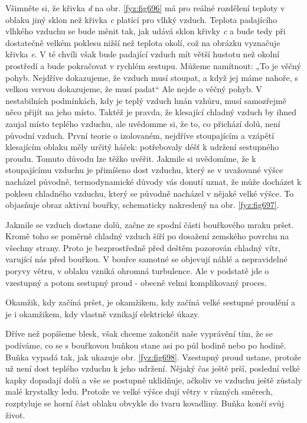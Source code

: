     Všimněte si, že křivka \emph{d} na obr. \ref{fyz:fig696} má pro reálné rozdělení teploty v
    oblaku jiný sklon než křivka \emph{c} platící pro vlhký vzduch. Teplota padajícího vlhkého
    vzduchu se bude měnit tak, jak udává sklon křivky \emph{c} a bude tedy při dostatečně velkém
    poklesu nižší než teplota okolí, což na obrázku vyznačuje křivka \emph{e}. V té chvíli však bude
    padající vzduch mít větší hustotu než okolní prostředí a bude pokračovat v rychlém sestupu.
    Můžeme namítnout: „To je věčný pohyb. Nejdříve dokazujeme, že vzduch musí stoupat, a když jej
    máme nahoře, s velkou vervou dokazujeme, že musí padat“ Ale nejde o věčný pohyb. V nestabilních
    podmínkách, kdy je teplý vzduch hnán vzhůru, musí samozřejmě něco přijít na jeho místo. Taktéž
    je pravda, že klesající chladný vzduch by ihned zaujal místo teplého vzduchu, ale uvědomme si,
    že to, co přichází dolů, není původní vzduch. První teorie o izolovaném, nejdříve stoupajícím a
    vzápětí klesajícím oblaku měly určitý háček: potřebovaly déšť k udržení sestupného proudu.
    Tomuto důvodu lze těžko uvěřit. Jakmile si uvědomíme, že k stoupajícímu vzduchu je přimíšeno
    dost vzduchu, který se v uvažované výšce nacházel původně, termodynamické důvody vás donutí
    uznat, že může docházet k poklesu chladného vzduchu, který se původně nacházel v nějaké velké
    výšce. To objasňuje obraz aktivní bouřky, schematicky nakreslený na obr. \ref{fyz:fig697}.

    Jakmile se vzduch dostane dolů, začne ze spodní části bouřkového mraku pršet. Kromě toho 
    se poměrně chladný vzduch šíří po dosažení zemského povrchu na všechny strany. Proto je
    bezprostředně před deštěm pozorován chladný vítr, varující nás před bouřkou. V bouřce samotné se
    objevují náhlé a nepravidelné poryvy větru, v oblaku vzniká ohromná turbulence. Ale v podstatě
    jde o vzestupný a potom sestupný proud - obecně velmi komplikovaný proces.

    Okamžik, kdy začíná pršet, je okamžikem, kdy začíná velké sestupné proudění a je i okamžikem,
    kdy vlastně vznikají elektrické úkazy.

    Dříve než popíšeme blesk, však chceme zakončit naše vyprávění tím, že se podíváme, co se s
    bouřkovou buňkou stane asi po půl hodině nebo po hodině. Buňka vypadá tak, jak ukazuje obr.
    \ref{fyz:fig698}. Vzestupný proud ustane, protože už není dost teplého vzduchu k jeho
    udržení. Nějaký čas ještě prší, poslední velké kapky dopadají dolů a vše se postupně uklidňuje,
    ačkoliv ve vzduchu ještě zůstaly malé krystalky ledu. Protože ve velké výšce dují větry v
    různých směrech, rozptyluje se horní část oblaku obvykle do tvaru kovadliny. Buňka končí svůj
    život.
   
